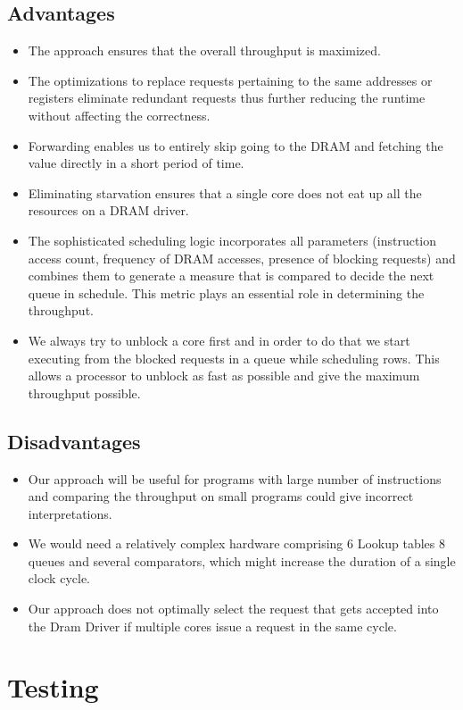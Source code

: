 \documentclass[hidelinks,12pt]{article}
\begin{document}
\subsection{Advantages}
\begin{itemize}
    \item The approach ensures that the overall throughput is maximized.
    \item The optimizations to replace requests pertaining to the same addresses or registers eliminate redundant requests thus further reducing the runtime without affecting the correctness.
    \item Forwarding enables us to entirely skip going to the DRAM and fetching the value directly in a short period of time.
    \item Eliminating starvation ensures that a single core does not eat up all the resources on a DRAM driver.
    \item The sophisticated scheduling logic incorporates all parameters (instruction access count, frequency of DRAM accesses, presence of blocking requests) and combines them to generate a measure that is compared to decide the next queue in schedule. This metric plays an essential role in determining the throughput.
    \item We always try to unblock a core first and in order to do that we start executing from the blocked requests in a queue while scheduling rows. This allows a processor to unblock as fast as possible and give the maximum throughput possible.
\end{itemize}
\subsection{Disadvantages}
\begin{itemize}
    \item Our approach will be useful for programs with large number of instructions and comparing the throughput on small programs could give incorrect interpretations.
    \item We would need a relatively complex hardware comprising 6 Lookup tables 8 queues and several comparators, which might increase the duration of a single clock cycle.
    \item Our approach does not optimally select the request that gets accepted into the Dram Driver if multiple cores issue a request in the same cycle.
\end{itemize}
\section{Testing}
\end{document}
